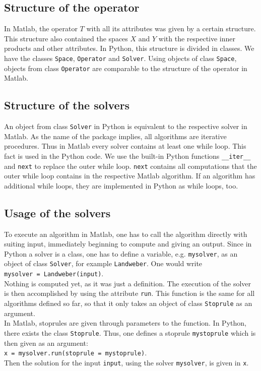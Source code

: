 \documentclass[12pt]{scrartcl}
\begin{document}
\subsection{Structure of the operator}
In Matlab, the operator $T$ with all its attributes was given by a certain structure. This structure also contained the spaces $X$ and $Y$ with the respective inner products and other attributes. In Python, this structure is divided in classes. We have the classes \texttt{Space}, \texttt{Operator} and \texttt{Solver}. Using objects of class \texttt{Space}, objects from class \texttt{Operator} are comparable to the structure of the operator in Matlab.
\subsection{Structure of the solvers}
An object from class \texttt{Solver} in Python is equivalent to the respective solver in Matlab. As the name of the package implies, all algorithms are iterative procedures. Thus in Matlab every solver contains at least one while loop. This fact is used in the Python code. We use the built-in Python functions \texttt{\_\_iter\_\_} and \texttt{next} to replace the outer while loop. \texttt{next} contains all computations that the outer while loop contains in the respective Matlab algorithm. If an algorithm has additional while loops, they are implemented in Python as while loops, too.
\subsection{Usage of the solvers}
To execute an algorithm in Matlab, one has to call the algorithm directly with suiting input, immediately beginning to compute and giving an output. Since in Python a solver is a class, one has to define a variable, e.g. \texttt{mysolver}, as an object of class \texttt{Solver}, for example \texttt{Landweber}. One would write\\
\texttt{mysolver = Landweber(input)}.\\
Nothing is computed yet, as it was just a definition. The execution of the solver is then accomplished by using the attribute \texttt{run}. This function is the same for all algorithms defined so far, so that it only takes an object of class \texttt{Stoprule} as an argument.\\
In Matlab, stoprules are given through parameters to the function. In Python, there exists the class \texttt{Stoprule}. Thus, one defines a stoprule \texttt{mystoprule} which is then given as an argument:\\
\texttt{x = mysolver.run(stoprule = mystoprule)}.\\
Then the solution for the input \texttt{input}, using the solver \texttt{mysolver}, is given in \texttt{x}.
\end{document}
